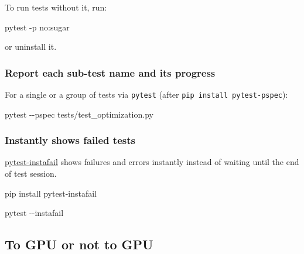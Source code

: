 \documentclass[
]{report}
\newenvironment{Shaded}{\begin{snugshade}}{\end{snugshade}}
\newcommand{\AttributeTok}[1]{\textcolor[rgb]{0.40,0.45,0.13}{#1}}
\newcommand{\ExtensionTok}[1]{\textcolor[rgb]{0.00,0.23,0.31}{#1}}
\newcommand{\NormalTok}[1]{\textcolor[rgb]{0.00,0.23,0.31}{#1}}
\begin{document}
To run tests without it, run:

\begin{Shaded}
\begin{Highlighting}[]
\ExtensionTok{pytest} \AttributeTok{{-}p}\NormalTok{ no:sugar}
\end{Highlighting}
\end{Shaded}

or uninstall it.

\subsubsection{Report each sub-test name and its
progress}\label{report-each-sub-test-name-and-its-progress}

For a single or a group of tests via \texttt{pytest} (after
\texttt{pip\ install\ pytest-pspec}):

\begin{Shaded}
\begin{Highlighting}[]
\ExtensionTok{pytest} \AttributeTok{{-}{-}pspec}\NormalTok{ tests/test\_optimization.py}
\end{Highlighting}
\end{Shaded}

\subsubsection{Instantly shows failed
tests}\label{instantly-shows-failed-tests}

\href{https://github.com/pytest-dev/pytest-instafail}{pytest-instafail}
shows failures and errors instantly instead of waiting until the end of
test session.

\begin{Shaded}
\begin{Highlighting}[]
\ExtensionTok{pip}\NormalTok{ install pytest{-}instafail}
\end{Highlighting}
\end{Shaded}

\begin{Shaded}
\begin{Highlighting}[]
\ExtensionTok{pytest} \AttributeTok{{-}{-}instafail}
\end{Highlighting}
\end{Shaded}

\subsection{To GPU or not to GPU}\label{to-gpu-or-not-to-gpu}
\end{document}
